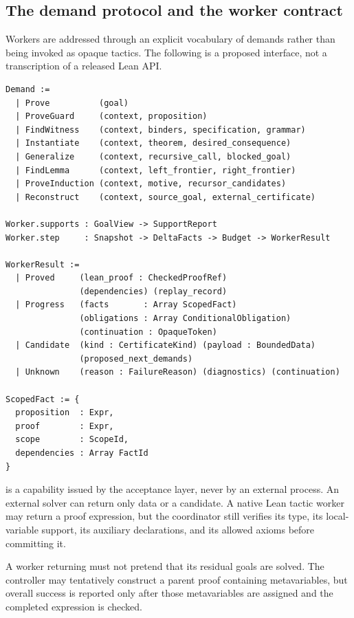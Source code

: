 \subsection{The demand protocol and the worker contract}

Workers are addressed through an explicit vocabulary of demands rather than
being invoked as opaque tactics. The following is a proposed interface, not a
transcription of a released Lean API.

\begin{lstlisting}
Demand :=
  | Prove          (goal)
  | ProveGuard     (context, proposition)
  | FindWitness    (context, binders, specification, grammar)
  | Instantiate    (context, theorem, desired_consequence)
  | Generalize     (context, recursive_call, blocked_goal)
  | FindLemma      (context, left_frontier, right_frontier)
  | ProveInduction (context, motive, recursor_candidates)
  | Reconstruct    (context, source_goal, external_certificate)

Worker.supports : GoalView -> SupportReport
Worker.step     : Snapshot -> DeltaFacts -> Budget -> WorkerResult

WorkerResult :=
  | Proved     (lean_proof : CheckedProofRef)
               (dependencies) (replay_record)
  | Progress   (facts       : Array ScopedFact)
               (obligations : Array ConditionalObligation)
               (continuation : OpaqueToken)
  | Candidate  (kind : CertificateKind) (payload : BoundedData)
               (proposed_next_demands)
  | Unknown    (reason : FailureReason) (diagnostics) (continuation)

ScopedFact := {
  proposition  : Expr,
  proof        : Expr,
  scope        : ScopeId,
  dependencies : Array FactId
}
\end{lstlisting}

 is a capability issued by the acceptance layer, never by
an external process. An external solver can return only data or a candidate. A
native Lean tactic worker may return a proof expression, but the coordinator
still verifies its type, its local-variable support, its auxiliary
declarations, and its allowed axioms before committing it.

A worker returning  must not pretend that its residual goals are
solved. The controller may tentatively construct a parent proof containing
metavariables, but overall success is reported only after those metavariables
are assigned and the completed expression is checked.

